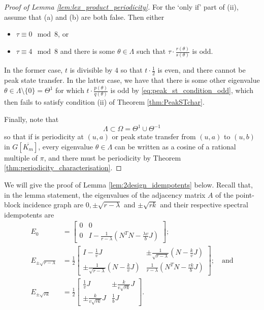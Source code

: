 \documentclass{article}
\numberwithin{equation}{section}
\begin{document}
\begin{proof}[Proof of Lemma \ref{lem:lex_product_periodicity}]
For the `only if' part of (ii), assume that (a) and (b) are both false. Then either
\begin{itemize}
\item $\tau \equiv 0 \mod 8$, or
\item $\tau \equiv 4 \mod 8$ and there is some $\theta \in \Lambda$ such that $\tau \cdot \frac{r(\theta)}{s(\theta)}$ is odd.
\end{itemize}
In the former case, $t$ is divisible by $4$ so that $t \cdot \frac{1}{2}$ is even, and there cannot be peak state transfer. In the latter case, we have that there is some other eigenvalue $\theta \in \Lambda \setminus \{0\} = \Theta^1$ for which $t \cdot \frac{p(\theta)}{q(\theta)}$ is odd by \eqref{eq:peak_st_condition_odd}, which then fails to satisfy condition (ii) of Theorem \ref{thm:PeakSTchar}.

Finally, note that
\[
\Lambda \subset \Omega = \Theta^1 \cup \Theta^{-1}
\]
so that if is periodicity at $(u,a)$ or peak state transfer from $(u,a)$ to $(u,b)$ in $G[\overline{K_m}]$, every eigenvalue $\theta \in \Lambda$ can be written as a cosine of a rational multiple of $\pi$, and there must be periodicity by Theorem \ref{thm:periodicity_characterisation}.
\end{proof}





We will give the proof of Lemma \ref{lem:2design_idempotents} below. Recall that, in the lemma statement,  the eigenvalues of the adjacency matrix $A$ of the point-block incidence graph are $0, \pm \sqrt{r-\lambda}$ and $\pm\sqrt{rk}$ and their respective spectral idempotents are
\begin{align*}
E_{0} &= 
\begin{bmatrix}
0 & 0 \\
0 & I - \frac{1}{r-\lambda}\left(N^TN - \frac{\lambda v}{b}J\right)
\end{bmatrix}; \\
E_{\pm \sqrt{r-\lambda}} &= 
\frac{1}{2}
\begin{bmatrix}
I - \frac{1}{v}J & \pm\frac{1}{\sqrt{r-\lambda}} \left(N - \frac{k}{v}J\right)\\
\pm \frac{1}{\sqrt{r-\lambda}} \left(N - \frac{k}{v}J\right) & \frac{1}{r-\lambda}\left(N^TN - \frac{rk}{b}J\right)
\end{bmatrix}
; \quad \text{and}\\
E_{\pm \sqrt{rk}} &= \frac{1}{2}
\begin{bmatrix}
\frac{1}{v}J & \pm \frac{k}{v\sqrt{rk}} J \\
\pm \frac{k}{v\sqrt{rk}} J & \frac{1}{b}J
\end{bmatrix}.
\end{align*}
\end{document}
